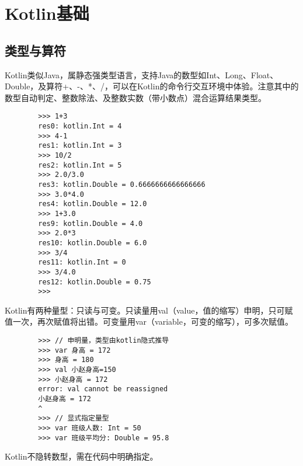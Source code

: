 \chapter{Kotlin基础}

\section{类型与算符}
Kotlin类似Java，属静态强类型语言，支持Java的数型如Int、Long、Float、Double，及算符+、-、*、/，可以在Kotlin的命令行交互环境中体验。注意其中的数型自动判定、整数除法、及整数实数（带小数点）混合运算结果类型。

    \begin{verbatim}
        >>> 1+3
        res0: kotlin.Int = 4
        >>> 4-1
        res1: kotlin.Int = 3
        >>> 10/2
        res2: kotlin.Int = 5
        >>> 2.0/3.0
        res3: kotlin.Double = 0.6666666666666666
        >>> 3.0*4.0
        res4: kotlin.Double = 12.0
        >>> 1+3.0
        res9: kotlin.Double = 4.0
        >>> 2.0*3
        res10: kotlin.Double = 6.0
        >>> 3/4
        res11: kotlin.Int = 0
        >>> 3/4.0
        res12: kotlin.Double = 0.75
        >>> 
    \end{verbatim}

Kotlin有两种量型：只读与可变。只读量用val（value，值的缩写）申明，只可赋值一次，再次赋值将出错。可变量用var（variable，可变的缩写），可多次赋值。

    \begin{verbatim}
        >>> // 申明量，类型由kotlin隐式推导
        >>> var 身高 = 172
        >>> 身高 = 180
        >>> val 小赵身高=150
        >>> 小赵身高 = 172
        error: val cannot be reassigned
        小赵身高 = 172
        ^
        >>> // 显式指定量型
        >>> var 班级人数: Int = 50
        >>> var 班级平均分: Double = 95.8        
    \end{verbatim}

Kotlin不隐转数型，需在代码中明确指定。

